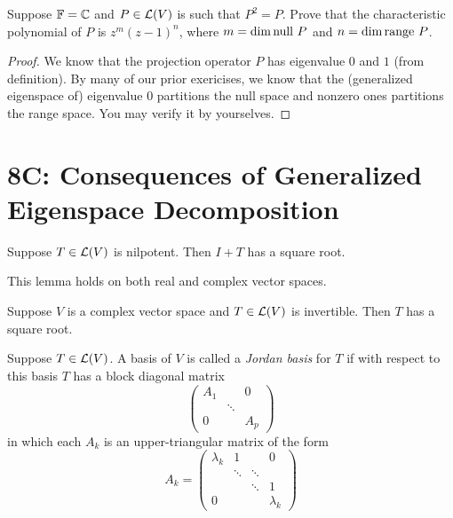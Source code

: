 \documentclass{extarticle}
\begin{document}
\begin{problem}{17}
    Suppose \(\mathbb{F} = \mathbb{C}\) and \(P \in \mathcal{L}(V)\) is such that \(P^2 = P\). Prove that the characteristic 
    polynomial of \(P\) is \(z^m (z-1)^n\), where \(m = \dim \text{null } P\) and \(n = \dim \text{range } P\).
\end{problem}

\begin{proof}
We know that the projection operator \(P\) has eigenvalue \(0\) and \(1\) (from definition). By many of 
our prior exericises, we know that the (generalized eigenspace of) eigenvalue 0 partitions the null space 
and nonzero ones partitions the range space. You may verify it by yourselves.
\end{proof}








\newpage 
\section*{8C: Consequences of Generalized Eigenspace Decomposition}


\begin{lemma}
    Suppose \(T \in \mathcal{L}(V)\) is nilpotent. Then \(I + T\) has a square root.
\end{lemma}

\begin{remark}
    This lemma holds on both real and complex vector spaces. 
\end{remark}

\begin{lemma}
    Suppose \(V\) is a complex vector space and \(T \in \mathcal{L}(V)\) is invertible. Then \(T\) has a square root.
\end{lemma}

\begin{definition}
    Suppose \(T \in \mathcal{L}(V)\). A basis of \(V\) is called a \emph{Jordan basis} for \(T\) if with respect 
    to this basis \(T\) has a block diagonal matrix 
    \[\begin{pmatrix}
        A_1 & & 0 \\ 
        & \ddots & \\ 
        0 & & A_p
    \end{pmatrix}\]
    in which each \(A_k\) is an upper-triangular matrix of the form 
    \[A_k = \begin{pmatrix}
        \lambda_k & 1 & & 0 \\ 
        & \ddots & \ddots & \\ 
        & & \ddots & 1  \\ 
        0 & & & \lambda_k 
    \end{pmatrix}\]
\end{definition}
\end{document}
